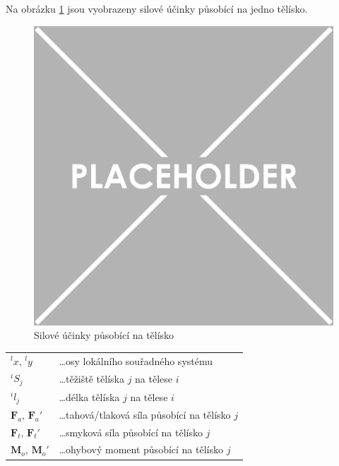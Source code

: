 Na obrázku \ref{fig:RFE_telisko} jsou vyobrazeny silové účinky působící na jedno tělísko.
\begin{figure} [H]
	\centering
	\includegraphics[width=0.85\linewidth]{img/placeholder.pdf}
	\caption{Silové účinky působící na tělísko}
	\label{fig:RFE_telisko}
\end{figure}
\begin{tabular}{@{}ll}
	$^lx, \, ^ly$ &\dots osy lokálního souřadného systému\\
	$ ^{i}S_{j} $ &\dots těžiště tělíska $ j $ na tělese $ i $\\
	$ ^{i}l_{j} $ &\dots délka tělíska $ j $ na tělese $ i $\\
	$ \mathbf{F}_a, \, \mathbf{F}_a' $ 	  &\dots tahová/tlaková síla působící na tělísko $ j $ \\
	$ \mathbf{F}_t, \, \mathbf{F}_t' $ 	  &\dots smyková síla působící na tělísko $ j $ \\
	$ \mathbf{M}_o, \, \mathbf{M}_o' $ 	  &\dots ohybový moment působící na tělísko $ j $ \\
\end{tabular}


